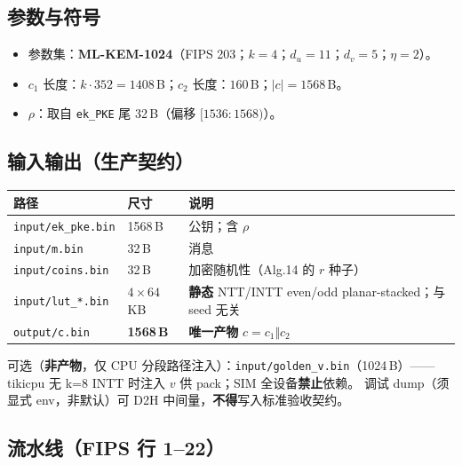 \documentclass[UTF8,a4paper,11pt]{ctexart}
\begin{document}
\subsection{参数与符号}

\begin{itemize}
  \item 参数集：\textbf{ML-KEM-1024}（FIPS 203；$k=4$；$d_u=11$；$d_v=5$；$\eta=2$）。
  \item $c_1$ 长度：$k\cdot 352=1408$\,B；$c_2$ 长度：$160$\,B；$|c|=1568$\,B。
  \item $\rho$：取自 \texttt{ek\_PKE} 尾 32\,B（偏移 $[1536:1568)$）。
\end{itemize}

\subsection{输入输出（生产契约）}

\begin{longtable}{@{}L{3.5cm}L{2.2cm}L{7.5cm}@{}}
\toprule
路径 & 尺寸 & 说明 \\
\midrule
\texttt{input/ek\_pke.bin} & 1568\,B & 公钥；含 $\rho$ \\
\texttt{input/m.bin} & 32\,B & 消息 \\
\texttt{input/coins.bin} & 32\,B & 加密随机性（Alg.14 的 $r$ 种子） \\
\texttt{input/lut\_*.bin} & $4\times 64$\,KB & \textbf{静态} NTT/INTT even/odd planar-stacked；与 seed 无关 \\
\texttt{output/c.bin} & \textbf{1568\,B} & \textbf{唯一产物} $c=c_1\Vert c_2$ \\
\bottomrule
\end{longtable}

可选（\textbf{非产物}，仅 CPU 分段路径注入）：\texttt{input/golden\_v.bin}（1024\,B）——tikicpu 无 k=8 INTT 时注入 $v$ 供 pack；SIM 全设备\textbf{禁止}依赖。
调试 dump（须显式 env，非默认）可 D2H 中间量，\textbf{不得}写入标准验收契约。

\subsection{流水线（FIPS 行 1--22）}
\end{document}
